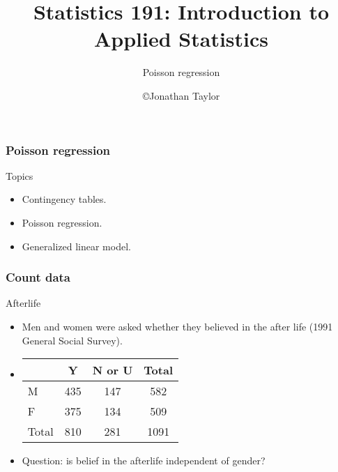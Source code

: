 \documentclass[handout]{beamer}
\title{Statistics 191: Introduction to Applied Statistics}
\subtitle{Poisson regression}
\author{\copyright Jonathan Taylor \\
   }
\begin{document}
   \begin{frame}
   \titlepage
   \end{frame}


   \begin{frame} \frametitle{Poisson regression}

   \begin{block}
   {Topics}
   \begin{itemize}


     \item Contingency tables.

     \item Poisson regression.


     \item Generalized linear model.

   \end{itemize}

   \end{block}
   \end{frame}


   \begin{frame} \frametitle{Count data}

   \begin{block}
     {Afterlife}
     \begin{itemize}
     \item   Men and women were asked whether they believed in the
   after life (1991 General Social Survey).

   \item
     \begin{tabular}{l|c|c|c}
       & Y & N or U & Total \\ \hline
   M & 435 & 147 & 582 \\
   F & 375 & 134 & 509 \\ \hline
   Total & 810 & 281 & 1091
     \end{tabular}

   \item Question: is belief in the afterlife independent of gender?

     \end{itemize}
   \end{block}
   \end{frame}

\end{document}
